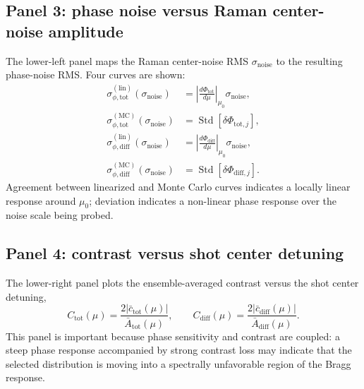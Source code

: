 \documentclass[11pt]{article}
\begin{document}
\subsection{Panel 3: phase noise versus Raman center-noise amplitude}
The lower-left panel maps the Raman center-noise RMS $\sigma_{\mathrm{noise}}$ to the resulting phase-noise RMS. Four curves are shown:
\begin{align}
\sigma_{\phi,\mathrm{tot}}^{(\mathrm{lin})}(\sigma_{\mathrm{noise}})
&=
\left|\frac{d\Phi_{\mathrm{tot}}}{d\mu}\right|_{\mu_0}\sigma_{\mathrm{noise}},
\label{eq:plot_total_linear}
\\
\sigma_{\phi,\mathrm{tot}}^{(\mathrm{MC})}(\sigma_{\mathrm{noise}})
&=
\operatorname{Std}\!\left[\delta\Phi_{\mathrm{tot},j}\right],
\label{eq:plot_total_mc}
\\
\sigma_{\phi,\mathrm{diff}}^{(\mathrm{lin})}(\sigma_{\mathrm{noise}})
&=
\left|\frac{d\Phi_{\mathrm{diff}}}{d\mu}\right|_{\mu_0}\sigma_{\mathrm{noise}},
\label{eq:plot_diff_linear}
\\
\sigma_{\phi,\mathrm{diff}}^{(\mathrm{MC})}(\sigma_{\mathrm{noise}})
&=
\operatorname{Std}\!\left[\delta\Phi_{\mathrm{diff},j}\right].
\label{eq:plot_diff_mc}
\end{align}
Agreement between linearized and Monte Carlo curves indicates a locally linear response around $\mu_0$; deviation indicates a non-linear phase response over the noise scale being probed.

\subsection{Panel 4: contrast versus shot center detuning}
The lower-right panel plots the ensemble-averaged contrast versus the shot center detuning,
\begin{equation}
C_{\mathrm{tot}}(\mu)
=
\frac{2|\bar{c}_{\mathrm{tot}}(\mu)|}{\bar{A}_{\mathrm{tot}}(\mu)},
\qquad
C_{\mathrm{diff}}(\mu)
=
\frac{2|\bar{c}_{\mathrm{diff}}(\mu)|}{\bar{A}_{\mathrm{diff}}(\mu)}.
\label{eq:contrast_plot_definitions}
\end{equation}
This panel is important because phase sensitivity and contrast are coupled: a steep phase response accompanied by strong contrast loss may indicate that the selected distribution is moving into a spectrally unfavorable region of the Bragg response.
\end{document}
